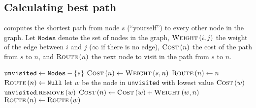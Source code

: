 \subsection{Calculating best path}
 computes the shortest path from node $s$ (``yourself'') to every other node in the graph. Let $\texttt{Nodes}$ denote the set of nodes in the graph, $\Call{Weight}{i, j}$ the weight of the edge between $i$ and $j$ ($\infty$ if there is no edge), $\Call{Cost}{n}$ the cost of the path from $s$ to $n$, and $\Call{Route}{n}$ the next node to visit in the path from $s$ to $n$.
\begin{algorithm}[H]
    \caption[Dijkstra's Algorithm]{}
    \label{alg:dijkstra}
    \begin{algorithmic}[1]
        \State $\texttt{unvisited} \gets \texttt{Nodes} - \left\{s\right\}$
        \State $\Call{Cost}{n} \gets \Call{Weight}{s, n}$
        \State $\Call{Route}{n} \gets n$
        \Else
        \State $\Call{Route}{n} \gets \Null$
        \EndIf
        \EndForEach
        \State let $w$ be the node in \texttt{unvisited} with lowest value $\Call{Cost}{w}$
        \State $\texttt{unvisited}.\Call{remove}{w}$
        \State $\Call{Cost}{n} \gets \Call{Cost}{w} + \Call{Weight}{w, n}$
        \State $\Call{Route}{n} \gets \Call{Route}{w}$
        \EndIf
        \EndForEach
        \EndWhile
    \end{algorithmic}
\end{algorithm}

